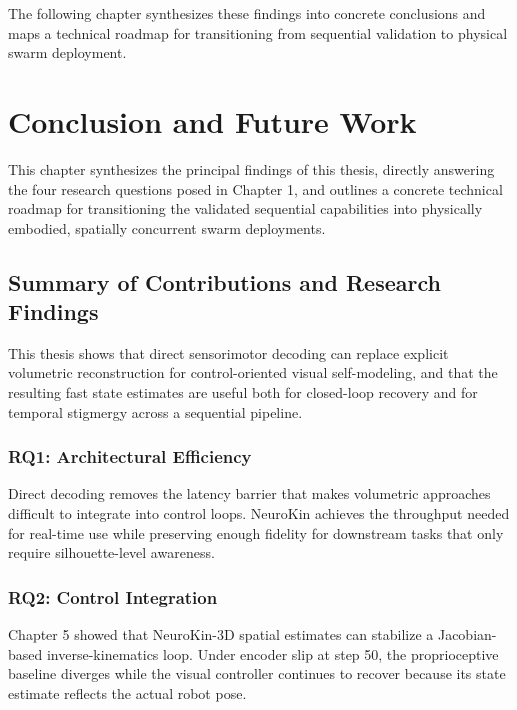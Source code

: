 \documentclass[12pt,a4paper,oneside]{report}
\begin{document}
The following chapter synthesizes these findings into concrete conclusions and maps a technical roadmap for transitioning from sequential validation to physical swarm deployment.





















\chapter{Conclusion and Future Work}

This chapter synthesizes the principal findings of this thesis, directly answering the four research questions posed in Chapter 1, and outlines a concrete technical roadmap for transitioning the validated sequential capabilities into physically embodied, spatially concurrent swarm deployments.

\section{Summary of Contributions and Research Findings}

This thesis shows that direct sensorimotor decoding can replace explicit volumetric reconstruction for control-oriented visual self-modeling, and that the resulting fast state estimates are useful both for closed-loop recovery and for temporal stigmergy across a sequential pipeline.

\subsection{RQ1: Architectural Efficiency}

Direct decoding removes the latency barrier that makes volumetric approaches difficult to integrate into control loops. NeuroKin achieves the throughput needed for real-time use while preserving enough fidelity for downstream tasks that only require silhouette-level awareness.

\subsection{RQ2: Control Integration}

Chapter 5 showed that NeuroKin-3D spatial estimates can stabilize a Jacobian-based inverse-kinematics loop. Under encoder slip at step 50, the proprioceptive baseline diverges while the visual controller continues to recover because its state estimate reflects the actual robot pose.
\end{document}
